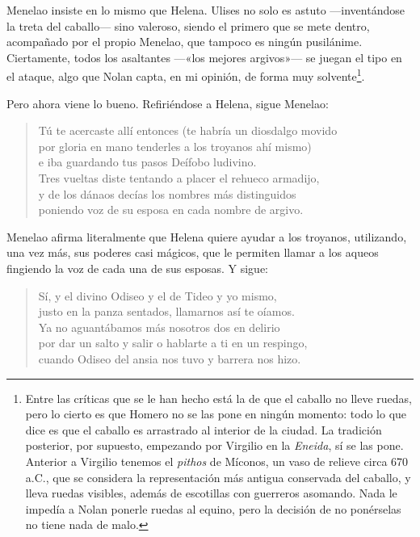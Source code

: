 \documentclass[11pt,a4paper]{article}
\begin{document}
Menelao insiste en lo mismo que Helena. Ulises no solo es astuto ---inventándose la treta del caballo--- sino valeroso, siendo el primero que se mete dentro, acompañado por el propio Menelao, que tampoco es ningún pusilánime. Ciertamente, todos los asaltantes ---«los mejores argivos»--- se juegan el tipo en el ataque, algo que Nolan capta, en mi opinión, de forma muy solvente\footnote{Entre las críticas que se le han hecho está la de que el caballo no lleve ruedas, pero lo cierto es que Homero no se las pone en ningún momento: todo lo que dice es que el caballo es arrastrado al interior de la ciudad. La tradición posterior, por supuesto, empezando por Virgilio en la \emph{Eneida}, sí se las pone. Anterior a Virgilio tenemos el \emph{pithos} de Míconos, un vaso de relieve circa 670 a.C., que se considera la representación más antigua conservada del caballo, y lleva ruedas visibles, además de escotillas con guerreros asomando. Nada le impedía a Nolan ponerle ruedas al equino, pero la decisión de no ponérselas no tiene nada de malo.}.

Pero ahora viene lo bueno. Refiriéndose a Helena, sigue Menelao:

\begin{verse}
Tú te acercaste allí entonces (te habría un diosdalgo movido\\
por gloria en mano tenderles a los troyanos ahí mismo)\\
e iba guardando tus pasos Deífobo ludivino.\\
Tres vueltas diste tentando a placer el rehueco armadijo,\\
y de los dánaos decías los nombres más distinguidos\\
poniendo voz de su esposa en cada nombre de argivo.
\end{verse}

Menelao afirma literalmente que Helena quiere ayudar a los troyanos, utilizando, una vez más, sus poderes casi mágicos, que le permiten llamar a los aqueos fingiendo la voz de cada una de sus esposas. Y sigue:


\begin{verse}
Sí, y el divino Odiseo y el de Tideo y yo mismo,\\
justo en la panza sentados, llamarnos así te oíamos.\\
Ya no aguantábamos más nosotros dos en delirio\\
por dar un salto y salir o hablarte a ti en un respingo,\\
cuando Odiseo del ansia nos tuvo y barrera nos hizo.
\end{verse}
\end{document}
